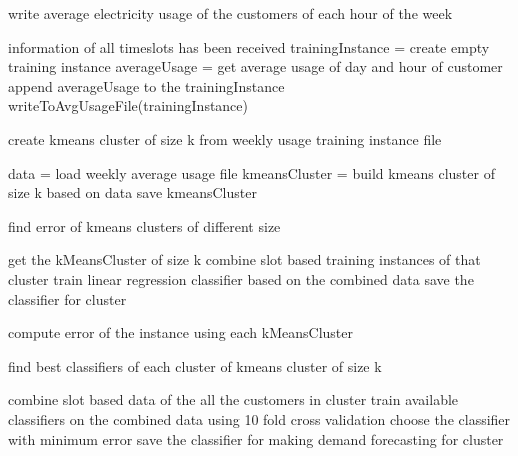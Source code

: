\begin{algorithm} [!h]
\caption{write average electricity usage of the customers of each hour of the week}
\begin{algorithmic} [1]
\REQUIRE information of all timeslots has been received
    \STATE trainingInstance = create empty training instance
            \STATE averageUsage = get average usage of day and hour of customer
            \STATE append averageUsage to the trainingInstance
        \ENDFOR
    \ENDFOR
    \STATE writeToAvgUsageFile(trainingInstance)
\ENDFOR
\end{algorithmic}
\label{alg:writeWeeklyAvg}
\end{algorithm}


\begin{algorithm}
\caption{create kmeans cluster of size k from weekly usage training instance file}
\begin{algorithmic} [1]
\STATE data = load weekly average usage file
\STATE kmeansCluster = build kmeans cluster of size k based on data
\STATE save kmeansCluster
\end{algorithmic}
\label{alg:makeCluster}
\end{algorithm}

\begin{algorithm}[!h]
\caption{find error of kmeans clusters of different size}
\begin{algorithmic} [1]

    \STATE get the kMeansCluster of size k
        \STATE combine slot based training instances of that cluster
        \STATE train linear regression classifier based on the combined data
        \STATE save the classifier for cluster
    \ENDFOR
\ENDFOR

    \STATE compute error of the instance using each kMeansCluster
\ENDFOR
\end{algorithmic}
\label{alg:errorOfCluster}
\end{algorithm}

\begin{algorithm} [!h]
\caption{find best classifiers of each cluster of kmeans cluster of size k}
\begin{algorithmic} [1]
    \STATE combine slot based data of the all the customers in cluster
    \STATE train available classifiers on the combined data using 10 fold cross validation
    \STATE choose the classifier with minimum error
    \STATE save the classifier for making demand forecasting for cluster
\ENDFOR 
\end{algorithmic}
\label{alg:bestClassifierForCluster}
\end{algorithm}

